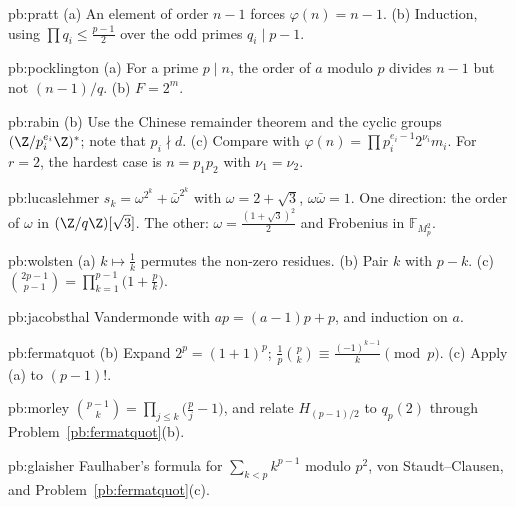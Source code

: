 \begin{hint}{pb:pratt}
(a) An element of order $n-1$ forces $\varphi(n)=n-1$. (b) Induction, using $\prod q_i\le\frac{p-1}2$ over the odd primes $q_i\mid p-1$.
\end{hint}

\begin{hint}{pb:pocklington}
(a) For a prime $p\mid n$, the order of $a$ modulo $p$ divides $n-1$ but not $(n-1)/q$. (b) $F=2^m$.
\end{hint}

\begin{hint}{pb:rabin}
(b) Use the Chinese remainder theorem and the cyclic groups $(\Z/p_i^{e_i}\Z)^*$; note that $p_i\nmid d$. (c) Compare with
$\varphi(n)=\prod p_i^{e_i-1}2^{\nu_i}m_i$. For $r=2$, the hardest case is $n=p_1p_2$ with $\nu_1=\nu_2$.
\end{hint}

\begin{hint}{pb:lucaslehmer}
$s_k=\omega^{2^k}+\bar\omega^{2^k}$ with $\omega=2+\sqrt3$, $\omega\bar\omega=1$. One direction: the order of $\omega$ in
$(\Z/q\Z)[\sqrt3]$. The other: $\omega=\frac{(1+\sqrt3)^2}2$ and Frobenius in $\mathbb F_{M_p^2}$.
\end{hint}

\begin{hint}{pb:wolsten}
(a) $k\mapsto\frac1k$ permutes the non-zero residues. (b) Pair $k$ with $p-k$. (c) $\binom{2p-1}{p-1}=\prod_{k=1}^{p-1}\bigl(1+\frac pk\bigr)$.
\end{hint}

\begin{hint}{pb:jacobsthal}
Vandermonde with $ap=(a-1)p+p$, and induction on $a$.
\end{hint}

\begin{hint}{pb:fermatquot}
(b) Expand $2^p=(1+1)^p$; $\frac1p\binom pk\equiv\frac{(-1)^{k-1}}k\pmod p$. (c) Apply (a) to $(p-1)!$.
\end{hint}

\begin{hint}{pb:morley}
$\binom{p-1}k=\prod_{j\le k}\bigl(\frac pj-1\bigr)$, and relate $H_{(p-1)/2}$ to $q_p(2)$ through Problem~\ref{pb:fermatquot}(b).
\end{hint}

\begin{hint}{pb:glaisher}
Faulhaber's formula for $\sum_{k<p}k^{p-1}$ modulo $p^2$, von Staudt--Clausen, and Problem~\ref{pb:fermatquot}(c).
\end{hint}

